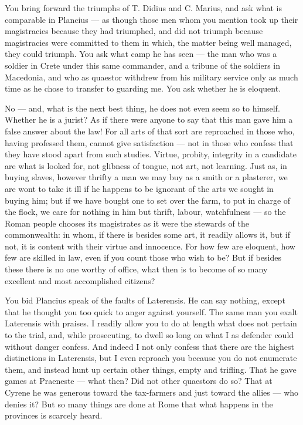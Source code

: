  You bring forward the triumphs of T. Didius and C. Marius, and ask what is comparable in Plancius --- as though those men whom you mention took up their magistracies because they had triumphed, and did not triumph because magistracies were committed to them in which, the matter being well managed, they could triumph. You ask what camp he has seen --- the man who was a soldier in Crete under this same commander, and a tribune of the soldiers in Macedonia, and who as quaestor withdrew from his military service only as much time as he chose to transfer to guarding me. You ask whether he is eloquent.

 No --- and, what is the next best thing, he does not even seem so to himself. Whether he is a jurist? As if there were anyone to say that this man gave him a false answer about the law! For all arts of that sort are reproached in those who, having professed them, cannot give satisfaction --- not in those who confess that they have stood apart from such studies. Virtue, probity, integrity in a candidate are what is looked for, not glibness of tongue, not art, not learning. Just as, in buying slaves, however thrifty a man we may buy as a smith or a plasterer, we are wont to take it ill if he happens to be ignorant of the arts we sought in buying him; but if we have bought one to set over the farm, to put in charge of the flock, we care for nothing in him but thrift, labour, watchfulness --- so the Roman people chooses its magistrates as it were the stewards of the commonwealth: in whom, if there is besides some art, it readily allows it, but if not, it is content with their virtue and innocence. For how few are eloquent, how few are skilled in law, even if you count those who wish to be? But if besides these there is no one worthy of office, what then is to become of so many excellent and most accomplished citizens?

 You bid Plancius speak of the faults of Laterensis. He can say nothing, except that he thought you too quick to anger against yourself. The same man you exalt Laterensis with praises. I readily allow you to do at length what does not pertain to the trial, and, while prosecuting, to dwell so long on what I as defender could without danger confess. And indeed I not only confess that there are the highest distinctions in Laterensis, but I even reproach you because you do not enumerate them, and instead hunt up certain other things, empty and trifling. That he gave games at Praeneste --- what then? Did not other quaestors do so? That at Cyrene he was generous toward the tax-farmers and just toward the allies --- who denies it? But so many things are done at Rome that what happens in the provinces is scarcely heard.

